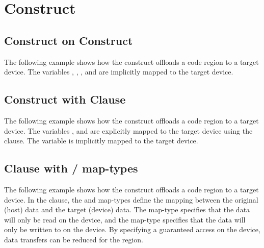 \pagebreak
\section{ Construct}
\label{sec:target}

\subsection{ Construct on  Construct}
\label{subsec:target_parallel}

The following example shows how the  construct offloads a code
region to a target device. The variables , , , and  are implicitly mapped 
to the target device.



\subsection{ Construct with  Clause}
\label{subsec:target_map}

The following example shows how the  construct offloads a code 
region to a target device. The variables ,  and  are explicitly mapped to the 
target device using the  clause. The variable  is implicitly mapped to 
the target device.



\subsection{ Clause with / map-types}
\label{subsec:target_map_tofrom}

The following example shows how the  construct offloads a code region 
to a target device. In the  clause, the  and  
map-types define the mapping between the original (host) data and the target (device) 
data. The  map-type specifies that the data will only be read on the 
device, and the  map-type specifies that the data will only be written 
to on the device. By specifying a guaranteed access on the device, data transfers 
can be reduced for the  region.

